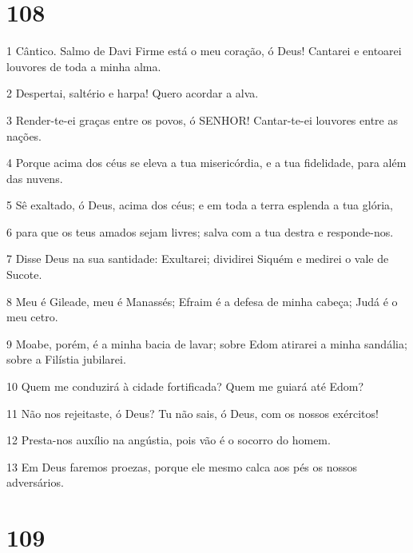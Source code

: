 \chapter{108}

\par 1 Cântico. Salmo de Davi Firme está o meu coração, ó Deus! Cantarei e entoarei louvores de toda a minha alma.
\par 2 Despertai, saltério e harpa! Quero acordar a alva.
\par 3 Render-te-ei graças entre os povos, ó SENHOR! Cantar-te-ei louvores entre as nações.
\par 4 Porque acima dos céus se eleva a tua misericórdia, e a tua fidelidade, para além das nuvens.
\par 5 Sê exaltado, ó Deus, acima dos céus; e em toda a terra esplenda a tua glória,
\par 6 para que os teus amados sejam livres; salva com a tua destra e responde-nos.
\par 7 Disse Deus na sua santidade: Exultarei; dividirei Siquém e medirei o vale de Sucote.
\par 8 Meu é Gileade, meu é Manassés; Efraim é a defesa de minha cabeça; Judá é o meu cetro.
\par 9 Moabe, porém, é a minha bacia de lavar; sobre Edom atirarei a minha sandália; sobre a Filístia jubilarei.
\par 10 Quem me conduzirá à cidade fortificada? Quem me guiará até Edom?
\par 11 Não nos rejeitaste, ó Deus? Tu não sais, ó Deus, com os nossos exércitos!
\par 12 Presta-nos auxílio na angústia, pois vão é o socorro do homem.
\par 13 Em Deus faremos proezas, porque ele mesmo calca aos pés os nossos adversários.

\chapter{109}

